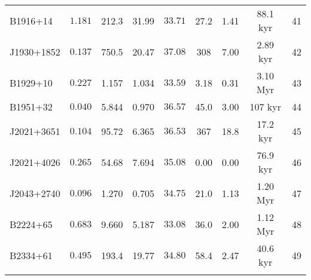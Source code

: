 \begin{table*}
\begin{center}
\begin{tabular}{|l|c|c|c|c|c|c|c|c|}
        B1916+14  &   $1.181$  &  212.3  &  31.99  &   $33.71$  &  27.2  &  1.41  &  88.1 kyr &  41  \\
        J1930+1852  &   $0.137$  &  750.5  &  20.47  &   $37.08$  &  308  &  7.00  &  2.89 kyr &  42  \\
        {\color{red}B1929+10}  &   $0.227$  &  1.157  &  1.034  &   $33.59$  &  3.18  &  0.31  &  3.10 Myr &  43  \\
        B1951+32  &   $0.040$  &  5.844  &  0.970  &   $36.57$  &  45.0  &  3.00  &  107 kyr &  44  \\
        J2021+3651  &   $0.104$  &  95.72  &  6.365  &   $36.53$  &  367  &  18.8  &  17.2 kyr &  45  \\
        {\color{red}J2021+4026}  &   $0.265$  &  54.68  &  7.694  &   $35.08$  &  0.00  &  0.00  &  76.9 kyr &  46  \\
        {\color{red}J2043+2740}  &   $0.096$  &  1.270  &  0.705  &   $34.75$  &  21.0  &  1.13  &  1.20 Myr &  47  \\
        {\color{red}B2224+65}  &   $0.683$  &  9.660  &  5.187  &   $33.08$  &  36.0  &  2.00  &  1.12 Myr &  48  \\
        B2334+61  &   $0.495$  &  193.4  &  19.77  &   $34.80$  &  58.4  &  2.47  &  40.6 kyr &  49  \\
      & & & & & & & & \\
      \hline
      \hline
  \end{tabular}
  \end{center}
\end{table*}
